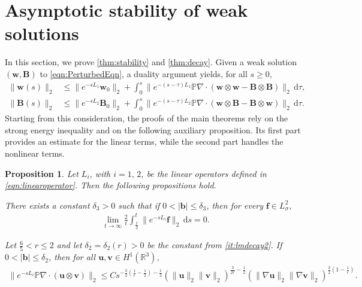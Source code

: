 \documentclass[10pt]{amsart}
\theoremstyle{plain}
\newtheorem{proposition}[lemma]{Proposition}
\theoremstyle{definition}
\theoremstyle{remark}
\numberwithin{equation}{section}
\newcommand{\R}{\mathbb{R}}
\newcommand{\bb}{{\boldsymbol{b}}}
\newcommand{\bu}{{\boldsymbol{u}}}
\newcommand{\bv}{{\boldsymbol{v}}}
\newcommand{\bw}{{\boldsymbol{w}}}
\newcommand{\bB}{{\boldsymbol{B}}}
\newcommand{\Bf}{{\boldsymbol{f}}}
\begin{document}
\section{Asymptotic stability of weak solutions}
\label{sec:proofs}

In this section, we prove \cref{thm:stability} and \cref{thm:decay}. 
 Given a weak solution $(\bw,\bB)$ to \cref{eqn:PerturbedEqn}, a duality argument yields, for all $s \ge 0$,
\begin{align*}
\|\bw(s)\|_2 &\leq \|e^{-sL_1} \bw_0\|_2 + \int_0^s \bigl\|e^{-(s-\tau)L_1} \mathbb{P} \nabla\cdot (\bw \otimes \bw - \bB \otimes \bB)\bigr\|_2 \, \mathrm{d}\tau,
\\
\|\bB(s)\|_2 &\leq \|e^{-sL_2} \bB_0\|_2 + \int_0^s \bigl\|e^{-(s-\tau)L_2} \mathbb{P} \nabla\cdot (\bw \otimes \bB - \bB \otimes \bw)\bigr\|_2 \, \mathrm{d}\tau.
\end{align*}
Starting from this consideration, the proofs of the main theorems rely on the strong energy inequality and on the following auxiliary proposition. Its first part provides an estimate for the linear terms, while the second part handles the nonlinear terms.

\begin{proposition} \label{lemma:a}
Let $L_i$, with $i =1,\,2$, be the linear operators defined in \cref{eqn:linearoperator}. Then the following propositions hold.
\begin{propenum}
\item \label{it:lma1} There exists a constant $\delta_3>0$ such that if $0<|\bb|\le \delta_3$, then for every $\Bf\in L^2_{\sigma}$,
\begin{align}\label{eqn:linearpart}
    \lim\limits_{t\to\infty} \frac{2}{t} \int_{\frac{t}{2}}^t \|e^{-sL_i}\Bf\|_2 \, \mathrm d s=0.
\end{align}    
 \item \label{it:lma2} Let $\frac{6}{5}<r\le2$ and let $\delta_2 = \delta_2(r) > 0$ be the constant from \cref{it:lmdecay2}. If $0<|\bb|\le \delta_2$, then for all $\bu,\bv\in H^1(\R^3)$,
    \begin{align}\label{eqn:nonlinearpart}
    \|e^{-sL_i} \mathbb{P} \nabla\cdot (\bu\otimes \bv)\|_2 \le C s^{-\frac{3}{2}\left(\frac{1}{r}-\frac{1}{2}\right)-\frac{1}{2}} 
    (\|\bu\|_2\|\bv\|_2)^{\frac{3}{2r}-\frac{1}{2}} (\|\nabla\bu\|_2\|\nabla \bv\|_2)^{\frac{3}{2}(1-\frac{1}{r})}.
    \end{align}
\end{propenum}
\end{proposition}
\end{document}
